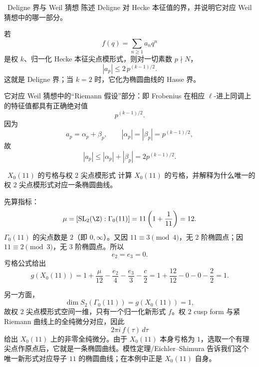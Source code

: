 \begin{problem}{\hard\ Deligne 界与 Weil 猜想}
陈述 Deligne 对 Hecke 本征值的界，并说明它对应 Weil 猜想中的哪一部分。
\end{problem}
\begin{solution}
若
\[
f(q)=\sum_{n\ge1} a_n q^n
\]
是权 $k$、归一化 Hecke 本征尖点模形式，则对一切素数 $p\nmid N$，
\[
|a_p|\le 2\,p^{(k-1)/2}.
\]
这就是 Deligne 界；当 $k=2$ 时，它化为椭圆曲线的 Hasse 界。

它对应 Weil 猜想中的“Riemann 假设”部分：即 Frobenius 在相应 $\ell$-进上同调上的特征值都具有正确绝对值
\[
p^{(k-1)/2}.
\]
因为
\[
a_p=\alpha_p+\beta_p,\qquad |\alpha_p|=|\beta_p|=p^{(k-1)/2},
\]
故
\[
|a_p|\le |\alpha_p|+|\beta_p|
=2p^{(k-1)/2}.
\]
\end{solution}

\begin{problem}{\hard\ $X_0(11)$ 的亏格与权 $2$ 尖点模形式}
计算 $X_0(11)$ 的亏格，并解释为什么唯一的权 $2$ 尖点模形式对应一条椭圆曲线。
\end{problem}
\begin{solution}
先算指标：
\[
\mu=[\mathrm{SL}_2(\Z):\Gamma_0(11)]
=11\left(1+\frac1{11}\right)=12.
\]
$\Gamma_0(11)$ 的尖点数是 $2$（即 $0,\infty$）。又因 $11\equiv3\pmod4$，无 $2$ 阶椭圆点；因 $11\equiv2\pmod3$，无 $3$ 阶椭圆点。所以
\[
e_2=e_3=0.
\]
亏格公式给出
\[
g(X_0(11))
=
1+\frac{\mu}{12}-\frac{e_2}{4}-\frac{e_3}{3}-\frac{c}{2}
=
1+\frac{12}{12}-0-0-\frac22
=1.
\]

另一方面，
\[
\dim S_2(\Gamma_0(11))=g(X_0(11))=1,
\]
故权 $2$ 尖点模形式空间一维，只有一个归一化新形式 $f$。权 $2$ cusp form 与紧 Riemann 曲线上的全纯微分对应，因此
\[
2\pi i\,f(\tau)\,d\tau
\]
给出 $X_0(11)$ 上的非零全纯微分。由于 $X_0(11)$ 本身亏格为 $1$，选取一个有理尖点作原点后，它就是一条椭圆曲线。模性定理/Eichler--Shimura 告诉我们这个唯一新形式对应导子 $11$ 的椭圆曲线；在本例中正是 $X_0(11)$ 自身。
\end{solution}

